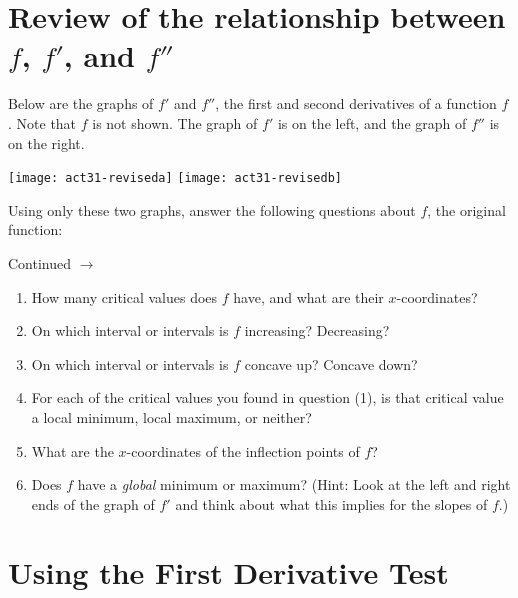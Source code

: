 \documentclass[11pt]{article}
\def\ra{\rightarrow}
\def\pageturn{\vfill 
\begin{flushright}
	\begin{small}
		Continued $\ra$
	\end{small}
\end{flushright} \newpage}
\begin{document}
\section{Review of the relationship between $f$, $f'$, and $f''$}

Below are the graphs of $f'$ and $f''$, the first and second derivatives of a function $f$. Note that $f$ is not shown. The graph of $f'$ is on the left, and the graph of $f''$ is on the right. 
\begin{center}
	\texttt{[image: act31-reviseda]}
	\quad
	\texttt{[image: act31-revisedb]}
\end{center}

Using only these two graphs, answer the following questions about $f$, the original function: 

\pageturn

\begin{enumerate}
	\item How many critical values does $f$ have, and what are their $x$-coordinates?
	\vspace{0.5in}
	
	\item On which interval or intervals is $f$ increasing? Decreasing? 
	\vspace{0.5in}
	
	\item On which interval or intervals is $f$ concave up? Concave down? 
	\vspace{0.5in}
	
	\item For each of the critical values you found in question (1), is that critical value a local minimum, local maximum, or neither? 
	\vspace{0.5in}
	
	\item What are the $x$-coordinates of the inflection points of $f$? 
	\vspace{0.3in}
	
	\item Does $f$ have a \emph{global} minimum or maximum? (Hint: Look at the left and right ends of the graph of $f'$ and think about what this implies for the slopes of $f$.) 
	\vspace{0.5in}
	
\end{enumerate}

\section{Using the First Derivative Test}
\end{document}
